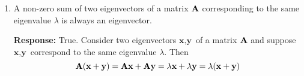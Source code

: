 \documentclass [12pt] {article}
\renewcommand{\bf}[1]{\textbf{{#1}}}
\begin{document}
\begin{enumerate}
\begin{enumerate}
\begin{enumerate}
                    \item A non-zero sum of two eigenvectors of a matrix $\A$ corresponding to the
                        same eigenvalue $\lambda$ is always an eigenvector. \vspace{10pt}

                        \bf{Response:} True. Consider two eigenvectors $\bf{x}, \bf{y}$ of a matrix
                        $\A$ and suppose $\bf{x}, \bf{y}$ correspond to the same eigenvalue $\lambda$. 
                        Then
                        \[\A(\bf{x} + \bf{y}) = \A \bf{x} + \A \bf{y} = \lambda \bf{x} + \lambda \bf{y} = \lambda(\bf{x} + \bf{y})\]
                \end{enumerate}
        \end{enumerate}
\end{enumerate}
\end{document}
